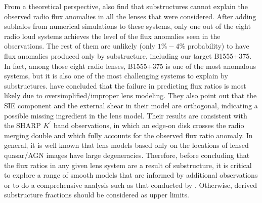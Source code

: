 \documentclass[useAMS,usenatbib]{mn2e}
\begin{document}
From a theoretical perspective, \citet{Xu14} also find that substructures
cannot explain the observed radio flux anomalies in all the lenses
that were considered. After adding subhalos from numerical simulations
to these systems, only one out of the eight radio loud systems
achieves the level of the flux anomalies seen in the observations.  The rest of
them are unlikely (only $1 \% - 4 \%$ probability) to have flux
anomalies produced only by substructure, including our target B1555+375.
In fact, among those eight radio lenses, B1555+375 is one of the most
anomalous systems, but it is also one of the most challenging systems
to explain by substructures. \citet{Xu14} have concluded that the failure in
predicting flux ratios is most likely due to oversimplified/improper lens
modeling. They also point out that the SIE component and the external
shear in their model are orthogonal, indicating a possible missing
ingredient in the lens model. Their results are consistent with the SHARP
$K^{\prime}$ band observations, in which an edge-on disk crosses the
radio merging double and which fully accounts for the observed flux ratio anomaly.  In general, it is well known 
\citep[e.g,][]{Ka91} that lens models based only on the locations of lensed
quasar/AGN images have large degeneracies. Therefore, before
concluding that the flux ratios in any given lens system are a result
of substructure, it is critical to explore a range of smooth models
that are informed by additional observations or to do a comprehensive
analysis such as that conducted by \citet{Xu14}. Otherwise, derived
substructure fractions should be considered as upper limits.
 
\end{document}
